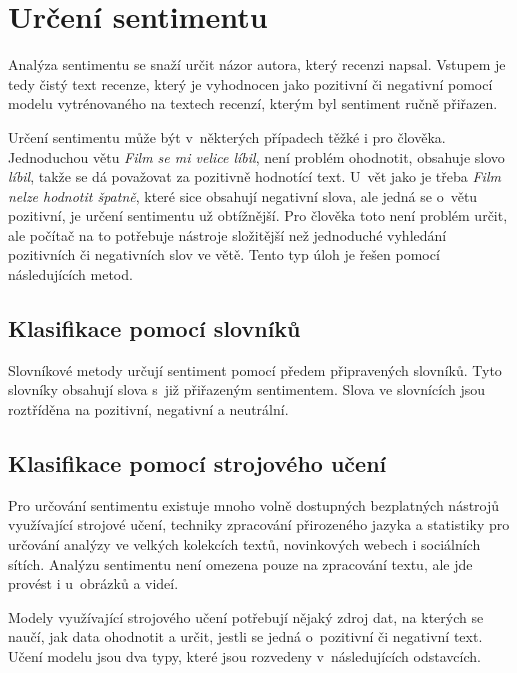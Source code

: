 \section{Určení sentimentu}

Analýza sentimentu se snaží určit názor autora, který recenzi napsal. Vstupem je tedy čistý text recenze, který je vyhodnocen jako pozitivní či negativní pomocí modelu vytrénovaného na textech recenzí, kterým byl sentiment ručně přiřazen. 

Určení sentimentu může být v~některých případech těžké i pro člověka. Jednoduchou větu \textit{Film se mi velice líbil}, není problém ohodnotit, obsahuje slovo \textit{líbil}, takže se dá považovat za pozitivně hodnotící text. U~vět jako je třeba \textit{Film nelze hodnotit špatně}, které sice obsahují negativní slova, ale jedná se o~větu pozitivní, je určení sentimentu už obtížnější. Pro člověka toto není problém určit, ale počítač na to potřebuje nástroje složitější než jednoduché vyhledání pozitivních či negativních slov ve větě\cite{cambria2017practical}. Tento typ úloh je řešen pomocí následujících metod\cite{FITMT22145}.

\subsection*{Klasifikace pomocí slovníků}
Slovníkové metody určují sentiment pomocí předem připravených slovníků. Tyto slovníky obsahují slova s~již přiřazeným sentimentem. Slova ve slovnících jsou roztříděna na pozitivní, negativní a neutrální\cite{FITMT22145}\cite{FITMT22451}\cite{taboada2011lexicon}.

\subsection*{Klasifikace pomocí strojového učení}

Pro určování sentimentu existuje mnoho volně dostupných bezplatných nástrojů využívající strojové učení, techniky zpracování přirozeného jazyka a statistiky pro určování analýzy ve velkých kolekcích textů, novinkových webech i sociálních sítích\cite{godbole2007large}. Analýzu sentimentu není omezena pouze na zpracování textu, ale jde provést i u~obrázků a videí.

Modely využívající strojového učení potřebují nějaký zdroj dat, na kterých se naučí, jak data ohodnotit a určit, jestli se jedná o~pozitivní či negativní text. Učení modelu jsou dva typy, které jsou rozvedeny v~následujících odstavcích\cite{FITMT22451}\cite{godbole2007large}\cite{FITMT22145}.

